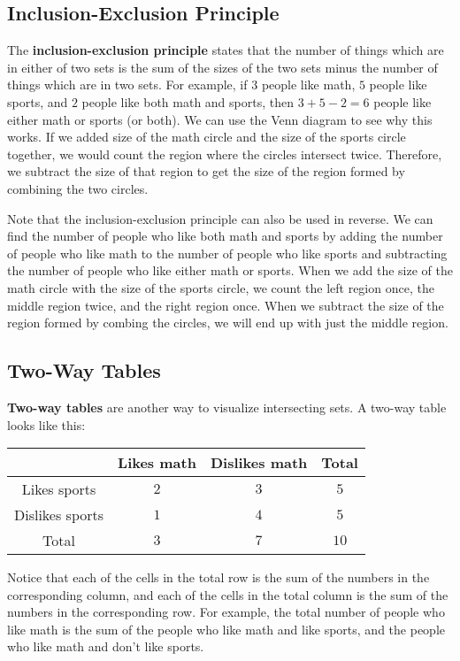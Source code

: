 \documentclass[twocolumn]{article}
\begin{document}
\subsection*{Inclusion-Exclusion Principle}
The \textbf{inclusion-exclusion principle} states that the number of things which are in either of two sets is the sum of the sizes of the two sets minus the number of things which are in two sets.
For example, if $3$ people like math, $5$ people like sports, and $2$ people like both math and sports, then $3 + 5 - 2 = 6$ people like either math or sports (or both).
We can use the Venn diagram to see why this works.
If we added size of the math circle and the size of the sports circle together, we would count the region where the circles intersect twice.
Therefore, we subtract the size of that region to get the size of the region formed by combining the two circles.

Note that the inclusion-exclusion principle can also be used in reverse.
We can find the number of people who like both math and sports by adding the number of people who like math to the number of people who like sports and subtracting the number of people who like either math or sports.
When we add the size of the math circle with the size of the sports circle, we count the left region once, the middle region twice, and the right region once.
When we subtract the size of the region formed by combing the circles, we will end up with just the middle region.

\subsection*{Two-Way Tables}
\textbf{Two-way tables} are another way to visualize intersecting sets.
A two-way table looks like this:
\begin{center}
	\begin{tabular}{| c | c | c | c |}
		\hline
                        & Likes math & Dislikes math & Total \\
		\hline
		Likes sports    & $2$        & $3$           & $5$   \\
		\hline
		Dislikes sports & $1$        & $4$           & $5$   \\
		\hline
		Total           & $3$        & $7$           & $10$  \\
		\hline
	\end{tabular}
\end{center}

Notice that each of the cells in the total row is the sum of the numbers in the corresponding column, and each of the cells in the total column is the sum of the numbers in the corresponding row.
For example, the total number of people who like math is the sum of the people who like math and like sports, and the people who like math and don't like sports.
\end{document}
